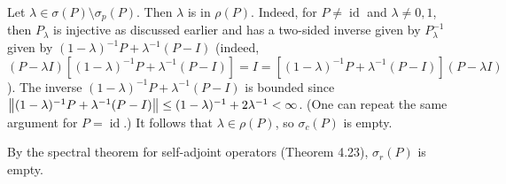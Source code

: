 \documentclass[11pt,leqno]{article}
\theoremstyle{plain}
\theoremstyle{definition}
\numberwithin{equation}{section}
\numberwithin{lem}{section}
\DeclareMathOperator{\id}{id}
\begin{document}
\begin{enumerate}
\begin{enumerate}
        Let $\lambda\in \sigma(P)\setminus \sigma_p(P)$. Then $\lambda$ is in $\rho(P)$. Indeed, for $P\neq \id$ and $\lambda\neq 0,1$, then $P_\lambda$ is injective as discussed earlier and has a two-sided inverse given by $P_\lambda^{-1}$ given by $(1-\lambda)^{-1}P + \lambda^{-1}(P-I)$ (indeed, $(P-\lambda I)[(1-\lambda)^{-1}P + \lambda^{-1}(P-I)] = I = [(1-\lambda)^{-1}P + \lambda^{-1}(P-I)](P-\lambda I)$). The inverse $(1-\lambda)^{-1}P + \lambda^{-1}(P-I)$ is bounded since $\norm{(1-\lambda)^{-1}P + \lambda^{-1}(P-I)}\leq (1-\lambda)^{-1} + 2\lambda^{-1}<\infty$. (One can repeat the same argument for $P = \id$.) It follows that $\lambda\in \rho(P)$, so $\sigma_c(P)$ is empty.

        By the spectral theorem for self-adjoint operators (Theorem 4.23), $\sigma_r(P)$ is empty.
    \end{enumerate}
\end{enumerate}
\end{document}
